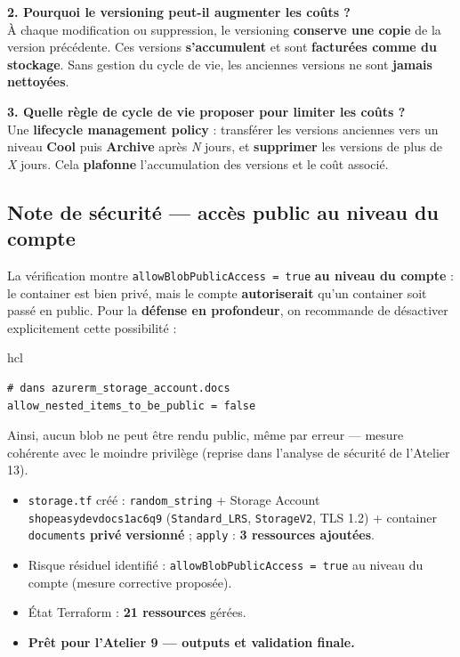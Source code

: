 \documentclass[11pt,a4paper]{article}
\newcommand{\code}[1]{\texttt{#1}}
\begin{document}
\textbf{2. Pourquoi le versioning peut-il augmenter les coûts ?}\\
À chaque modification ou suppression, le versioning \textbf{conserve une copie} de la version précédente. Ces
versions \textbf{s'accumulent} et sont \textbf{facturées comme du stockage}. Sans gestion du cycle de vie, les
anciennes versions ne sont \textbf{jamais nettoyées}.

\textbf{3. Quelle règle de cycle de vie proposer pour limiter les coûts ?}\\
Une \textbf{lifecycle management policy} : transférer les versions anciennes vers un niveau \textbf{Cool} puis
\textbf{Archive} après \textit{N} jours, et \textbf{supprimer} les versions de plus de \textit{X} jours. Cela
\textbf{plafonne} l'accumulation des versions et le coût associé.

\subsection{Note de sécurité — accès public au niveau du compte}
La vérification montre \code{allowBlobPublicAccess = true} \textbf{au niveau du compte} : le container est bien
privé, mais le compte \textbf{autoriserait} qu'un container soit passé en public. Pour la \textbf{défense en
profondeur}, on recommande de désactiver explicitement cette possibilité :
\begin{codebox}{hcl}
\begin{Verbatim}
# dans azurerm_storage_account.docs
allow_nested_items_to_be_public = false
\end{Verbatim}
\end{codebox}
Ainsi, aucun blob ne peut être rendu public, même par erreur — mesure cohérente avec le moindre privilège
(reprise dans l'analyse de sécurité de l'Atelier 13).

\begin{etatbox}
\begin{itemize}
  \item \code{storage.tf} créé : \code{random\_string} + Storage Account \code{shopeasydevdocs1ac6q9} (\code{Standard\_LRS}, \code{StorageV2}, TLS 1.2) + container \code{documents} \textbf{privé} \textbf{versionné} ; \code{apply} : \textbf{3 ressources ajoutées}.
  \item Risque résiduel identifié : \code{allowBlobPublicAccess = true} au niveau du compte (mesure corrective proposée).
  \item État Terraform : \textbf{21 ressources} gérées.
  \item \textbf{Prêt pour l'Atelier 9 — outputs et validation finale.}
\end{itemize}
\end{etatbox}
\end{document}
